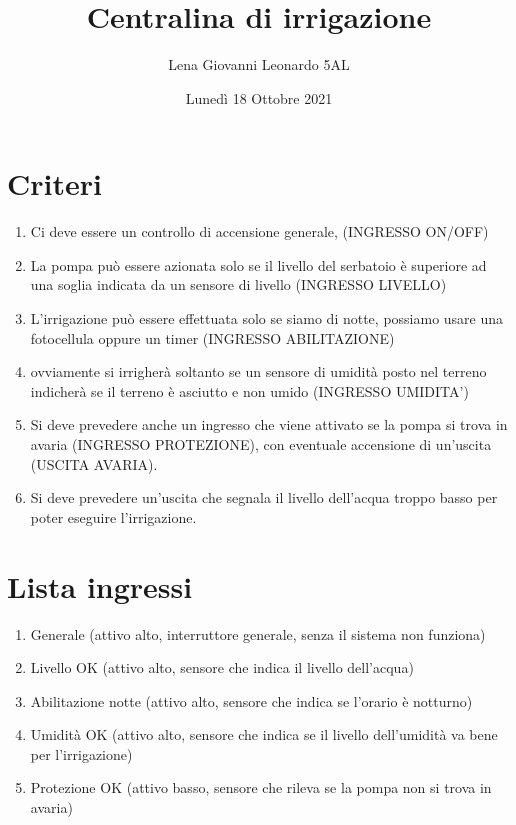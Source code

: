 \documentclass{article}
\title{Centralina di irrigazione}
\author{Lena Giovanni Leonardo 5AL}
\date{Lunedì 18 Ottobre 2021}
\begin{document}
    \maketitle

    \section{Criteri}

    \begin{enumerate}
        \item Ci deve essere un controllo di accensione generale, (INGRESSO ON/OFF)
        \item La pompa può essere azionata solo se il livello del serbatoio è superiore ad una soglia indicata da un sensore di livello (INGRESSO LIVELLO)
        \item L’irrigazione può essere effettuata solo se siamo di notte, possiamo usare una fotocellula oppure un timer (INGRESSO ABILITAZIONE)
        \item ovviamente si irrigherà soltanto se un sensore di umidità posto nel terreno indicherà se il terreno è asciutto e non umido (INGRESSO UMIDITA’)
        \item Si deve prevedere anche un ingresso che viene attivato se la pompa si trova in avaria (INGRESSO PROTEZIONE), con eventuale accensione di un’uscita (USCITA AVARIA).
        \item Si deve prevedere un'uscita che segnala il livello dell'acqua troppo basso per poter eseguire l'irrigazione.
    \end{enumerate}

    \section{Lista ingressi}

    \begin{enumerate}
        \item Generale (attivo alto, interruttore generale, senza il sistema non funziona)
        \item Livello OK (attivo alto, sensore che indica il livello dell'acqua)
        \item Abilitazione notte (attivo alto, sensore che indica se l'orario è notturno)
        \item Umidità OK (attivo alto, sensore che indica se il livello dell'umidità va bene per l'irrigazione)
        \item Protezione OK (attivo basso, sensore che rileva se la pompa non si trova in avaria)
    \end{enumerate}
\end{document}
